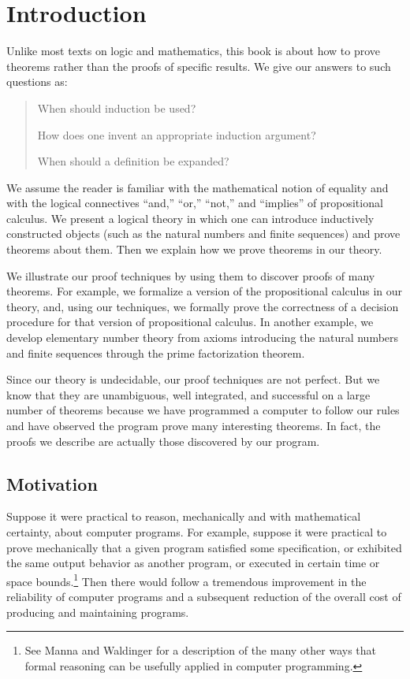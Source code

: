 \documentclass[10pt]{book}
\newenvironment{pubcrown}{\begin{quote}}{\end{quote}}
\begin{document}
\chapter{Introduction}
\pagestyle{headings}
Unlike most texts on logic and mathematics, this book is about
how to prove theorems rather than the proofs of specific results.
We give our answers to such questions as:

\begin{pubcrown}
When should induction be used?

How does one invent an appropriate induction argument?

When should a definition be expanded?
\end{pubcrown}

We assume the reader is familiar with the mathematical
notion of equality and with the logical connectives ``and,'' ``or,'' ``not,''
and ``implies'' of propositional calculus.  We present a logical theory
in which one can introduce inductively constructed objects (such as the
natural numbers and finite sequences) and prove theorems
about them.  Then we explain how we prove theorems in our theory.

We illustrate our proof techniques by using them to discover proofs
of many theorems.  For example, we formalize a version of
the propositional calculus in our theory, and, using our techniques, we
formally prove the correctness of a decision procedure
for that version of propositional calculus.
In another example, we develop elementary number theory from axioms
introducing the natural numbers and finite sequences through
the prime factorization theorem.

Since our theory is undecidable, our proof techniques are
not perfect.  But we know that they are unambiguous, well integrated,
and successful on a large number of theorems because we have programmed
a computer to follow our rules and have observed the program prove
many interesting theorems.  In fact, the proofs we describe are actually
those discovered by our program.

\section{Motivation}
Suppose it were practical to reason, mechanically and with mathematical
certainty, about computer programs.  For example, suppose it were practical
to prove mechanically that a given program satisfied some specification, or
exhibited the same output behavior as another program, or
executed in certain time or space bounds.\footnote{See Manna and Waldinger \cite{MW} for a description of the many other ways that formal reasoning can be usefully applied in computer programming.}
Then there would follow a tremendous improvement in the reliability of
computer programs and a subsequent reduction of the overall cost of
producing and maintaining programs.
\end{document}
